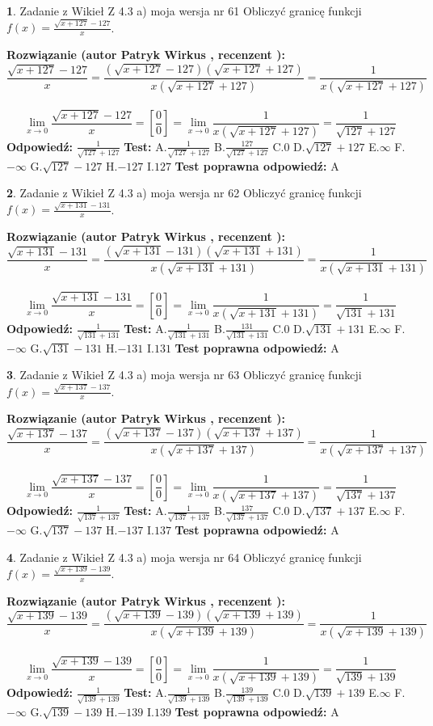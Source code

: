 \documentclass[12pt, a4paper]{article}
\theoremstyle{definition} %
\newtheorem{zad}{}
\newcommand{\zadStart}[1]{\begin{zad}#1\newline}
\newcommand{\zadStop}{\end{zad}}
\newcommand{\rozwStart}[2]{\noindent \textbf{Rozwiązanie (autor #1 , recenzent #2): }\newline}
\newcommand{\rozwStop}{\newline}
\newcommand{\odpStart}{\noindent \textbf{Odpowiedź:}\newline}
\newcommand{\odpStop}{\newline}
\newcommand{\testStart}{\noindent \textbf{Test:}\newline}
\newcommand{\testStop}{\newline}
\newcommand{\kluczStart}{\noindent \textbf{Test poprawna odpowiedź:}\newline}
\newcommand{\kluczStop}{\newline}
\begin{document}
\zadStart{Zadanie z Wikieł Z 4.3 a) moja wersja nr 61}
Obliczyć granicę funkcji $f(x)=\frac{\sqrt{x+127}-127}{x}$.
\zadStop
\rozwStart{Patryk Wirkus}{}
$$\frac{\sqrt{x+127}-127}{x}=\frac{(\sqrt{x+127}-127)(\sqrt{x+127}+127)}{x(\sqrt{x+127}+127)}=\frac{1}{x(\sqrt{x+127}+127)}$$
\\
$$\lim\limits_{x\to0}\frac{\sqrt{x+127}-127}{x}=[\frac{0}{0}]=
\lim\limits_{x\to0}\frac{1}{x(\sqrt{x+127}+127)} = \frac{1}{\sqrt{127}+127}$$
\rozwStop
\odpStart
$\frac{1}{\sqrt{127}+127}$
\odpStop
\testStart
A.$\frac{1}{\sqrt{127}+127}$
B.$\frac{127}{\sqrt{127}+127}$
C.$0$
D.$\sqrt{127}+127$
E.$\infty$
F.$-\infty$
G.$\sqrt{127}-127$
H.$-127$
I.$127$
\testStop
\kluczStart
A
\kluczStop



\zadStart{Zadanie z Wikieł Z 4.3 a) moja wersja nr 62}
Obliczyć granicę funkcji $f(x)=\frac{\sqrt{x+131}-131}{x}$.
\zadStop
\rozwStart{Patryk Wirkus}{}
$$\frac{\sqrt{x+131}-131}{x}=\frac{(\sqrt{x+131}-131)(\sqrt{x+131}+131)}{x(\sqrt{x+131}+131)}=\frac{1}{x(\sqrt{x+131}+131)}$$
\\
$$\lim\limits_{x\to0}\frac{\sqrt{x+131}-131}{x}=[\frac{0}{0}]=
\lim\limits_{x\to0}\frac{1}{x(\sqrt{x+131}+131)} = \frac{1}{\sqrt{131}+131}$$
\rozwStop
\odpStart
$\frac{1}{\sqrt{131}+131}$
\odpStop
\testStart
A.$\frac{1}{\sqrt{131}+131}$
B.$\frac{131}{\sqrt{131}+131}$
C.$0$
D.$\sqrt{131}+131$
E.$\infty$
F.$-\infty$
G.$\sqrt{131}-131$
H.$-131$
I.$131$
\testStop
\kluczStart
A
\kluczStop



\zadStart{Zadanie z Wikieł Z 4.3 a) moja wersja nr 63}
Obliczyć granicę funkcji $f(x)=\frac{\sqrt{x+137}-137}{x}$.
\zadStop
\rozwStart{Patryk Wirkus}{}
$$\frac{\sqrt{x+137}-137}{x}=\frac{(\sqrt{x+137}-137)(\sqrt{x+137}+137)}{x(\sqrt{x+137}+137)}=\frac{1}{x(\sqrt{x+137}+137)}$$
\\
$$\lim\limits_{x\to0}\frac{\sqrt{x+137}-137}{x}=[\frac{0}{0}]=
\lim\limits_{x\to0}\frac{1}{x(\sqrt{x+137}+137)} = \frac{1}{\sqrt{137}+137}$$
\rozwStop
\odpStart
$\frac{1}{\sqrt{137}+137}$
\odpStop
\testStart
A.$\frac{1}{\sqrt{137}+137}$
B.$\frac{137}{\sqrt{137}+137}$
C.$0$
D.$\sqrt{137}+137$
E.$\infty$
F.$-\infty$
G.$\sqrt{137}-137$
H.$-137$
I.$137$
\testStop
\kluczStart
A
\kluczStop



\zadStart{Zadanie z Wikieł Z 4.3 a) moja wersja nr 64}
Obliczyć granicę funkcji $f(x)=\frac{\sqrt{x+139}-139}{x}$.
\zadStop
\rozwStart{Patryk Wirkus}{}
$$\frac{\sqrt{x+139}-139}{x}=\frac{(\sqrt{x+139}-139)(\sqrt{x+139}+139)}{x(\sqrt{x+139}+139)}=\frac{1}{x(\sqrt{x+139}+139)}$$
\\
$$\lim\limits_{x\to0}\frac{\sqrt{x+139}-139}{x}=[\frac{0}{0}]=
\lim\limits_{x\to0}\frac{1}{x(\sqrt{x+139}+139)} = \frac{1}{\sqrt{139}+139}$$
\rozwStop
\odpStart
$\frac{1}{\sqrt{139}+139}$
\odpStop
\testStart
A.$\frac{1}{\sqrt{139}+139}$
B.$\frac{139}{\sqrt{139}+139}$
C.$0$
D.$\sqrt{139}+139$
E.$\infty$
F.$-\infty$
G.$\sqrt{139}-139$
H.$-139$
I.$139$
\testStop
\kluczStart
A
\kluczStop
\end{document}
